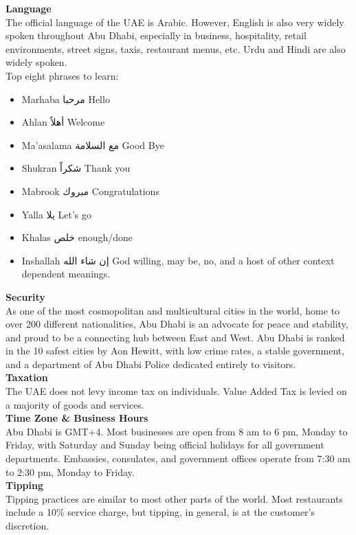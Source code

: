 {\large \textbf{Language}}\\
The official language of the UAE is Arabic. However, English is also very widely spoken throughout Abu Dhabi, 
especially in business, hospitality, retail environments, street signs, taxis, restaurant menus, etc.
Urdu and Hindi are also widely spoken.\\
Top eight phrases to learn:
\begin{itemize}
    \item Marhaba مرحبا Hello
    \item Ahlan أهلاً Welcome
    \item Ma’asalama مع السلامة Good Bye
    \item Shukran شكراً Thank you
    \item Mabrook مبروك Congratulations
    \item Yalla يلا Let’s go
    \item Khalas خلص enough/done
    \item Inshallah إن شاء الله God willing, may be, no, and a host of other context dependent meanings.
\end{itemize}

{\large \textbf{Security}}\\
As one of the most cosmopolitan and multicultural cities in the world, home to over 200 different nationalities, 
 Abu Dhabi is an advocate for peace and stability, and proud to be a connecting hub between East and West.
Abu Dhabi is ranked in the 10 safest cities by Aon Hewitt, with low crime rates, a stable government,
 and a department of Abu Dhabi Police dedicated entirely to visitors.\\

{\large \textbf{Taxation}}\\
The UAE does not levy income tax on individuals. Value Added Tax is levied on a majority of goods and services.\\

{\large \textbf{Time Zone & Business Hours}}\\
Abu Dhabi is GMT+4. Most businesses are open from 8 am to 6 pm, Monday to Friday,
 with Saturday and Sunday being official holidays for all government departments. 
Embassies, consulates, and government offices operate from 7:30 am to 2:30 pm, Monday to Friday.\\

{\large \textbf{Tipping}}\\
Tipping practices are similar to most other parts of the world. 
Most restaurants include a 10\% service charge, but tipping, in general, is at the customer’s discretion.\\


